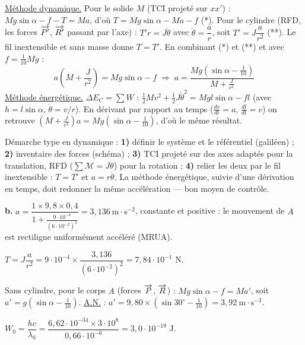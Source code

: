 \documentclass[11pt]{article}
\begin{document}
 \underline{Méthode dynamique.} Pour le solide $M$ (TCI projeté sur $xx'$) : $Mg\sin\alpha - f - T = Ma$, d'où $T = Mg\sin\alpha - Ma - f$ \;(*). Pour le cylindre (RFD, les forces $\overrightarrow{P'}$, $\overrightarrow{R'}$ passant par l'axe) : $T'r = J\ddot{\theta}$ avec $\ddot{\theta} = \dfrac{a}{r}$, soit $T' = J\dfrac{a}{r^2}$ \;(**). Le fil inextensible et sans masse donne $T = T'$. En combinant (*) et (**) et avec $f = \frac{1}{10}Mg$ :
\[ a\left(M + \frac{J}{r^2}\right) = Mg\sin\alpha - f \;\Rightarrow\; \boxed{a = \dfrac{Mg\left(\sin\alpha - \frac{1}{10}\right)}{M + \frac{J}{r^2}}} \]
\underline{Méthode énergétique.} $\Delta E_C = \sum W$ : $\frac{1}{2}Mv^2 + \frac{1}{2}J\dot{\theta}^2 = Mgl\sin\alpha - f l$ (avec $h = l\sin\alpha$, $\dot{\theta} = v/r$). En dérivant par rapport au temps ($\frac{dv}{dt} = a$, $\frac{dl}{dt} = v$) on retrouve $\left(M + \frac{J}{r^2}\right)a = Mg\left(\sin\alpha - \frac{1}{10}\right)$, d'où le même résultat.

\begin{methode}
Démarche type en dynamique : \textbf{1)} définir le système et le
référentiel (galiléen) ; \textbf{2)} inventaire des forces (schéma) ;
\textbf{3)} TCI projeté sur des axes adaptés pour la translation, RFD
($\sum \mathcal{M} = J\ddot{\theta}$) pour la rotation ;
\textbf{4)} relier les deux par le fil inextensible : $T = T'$ et
$a = r\ddot{\theta}$. La méthode énergétique, suivie d'une dérivation
en temps, doit redonner la même accélération — bon moyen de contrôle.
\end{methode}

\textbf{b.} $a = \dfrac{1\times 9{,}8\times 0{,}4}{1 + \frac{9\cdot10^{-4}}{(6\cdot10^{-2})^2}} = 3{,}136\ \text{m}\cdot\text{s}^{-2}$, constante et positive : le mouvement de $A$ est rectiligne uniformément accéléré (MRUA).

 $T = J\dfrac{a}{r^2} = 9\cdot10^{-4}\times\dfrac{3{,}136}{(6\cdot10^{-2})^2} = 7{,}84\cdot10^{-1}$ N.

 Sans cylindre, pour le corps $A$ (forces $\overrightarrow{P}$, $\overrightarrow{R}$) : $Mg\sin\alpha - f = Ma'$, soit $a' = g\left(\sin\alpha - \frac{1}{10}\right)$. \underline{A.N.} : $a' = 9{,}80\times\left(\sin 30^\circ - \frac{1}{10}\right) = 3{,}92\ \text{m}\cdot\text{s}^{-2}$.


 $W_0 = \dfrac{hc}{\lambda_0} = \dfrac{6{,}62\cdot10^{-34}\times 3\cdot10^{8}}{0{,}66\cdot10^{-6}} = 3{,}0\cdot10^{-19}$ J.
\end{document}

